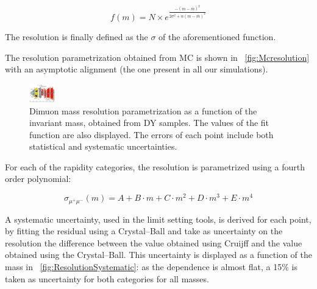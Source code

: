 \begin{equation}
\label{eqn:cruijff} 
f(m) = N \times e^{\frac{-(m-\bar{m})^2}{2\sigma^2+\alpha(m-\bar{m})^2}} 
\end{equation}

The resolution is finally defined as the $\sigma$ of the aforementioned function. 
  

The resolution parametrization obtained from MC is shown in \figurename~\ref{fig:Mcresolution} with an asymptotic alignment (the one present in all our simulations). 

\begin{figure}[htbp]
\centering
\includegraphics[width=0.1\textwidth]{Images/ParticleFlow}
\caption{Dimuon mass resolution parametrization as a function of the invariant mass, obtained from DY samples. The values of the fit function are also displayed. The errors of each point include both statistical and systematic uncertainties. %
}
\label{Mcresolution}
\end{figure}

For each of the rapidity categories, the resolution is parametrized using a fourth order polynomial: 

\begin{equation}\label{eqn:massres} 
	\sigma_{\mu^+\mu^-}(m) = A + B \cdot m + C \cdot m^2  + D \cdot m^3 + E \cdot m^4
\end{equation}

A systematic uncertainty, used in the limit setting tools, is derived for each point, by fitting the residual using a Crystal--Ball and take as uncertainty on the resolution the difference between the value obtained using Cruijff and the value obtained using the Crystal--Ball.  This uncertainty is displayed as a function of the mass in \figurename~\ref{fig:ResolutionSystematic}: as the dependence is almost flat, a 15\%  is  taken as uncertainty for both categories for all masses. 
 
